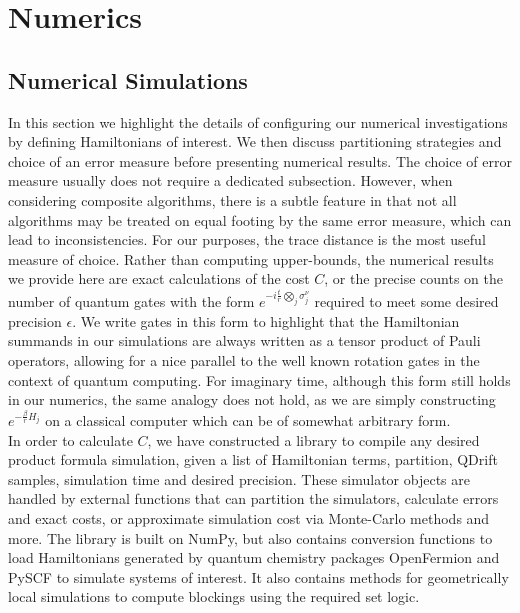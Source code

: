 \chapter{Numerics}


\section{Numerical Simulations} \label{sec:numerical_sim}
In this section we highlight the details of configuring our numerical investigations by defining Hamiltonians of interest. We then discuss partitioning strategies and choice of an error measure before presenting numerical results. The choice of error measure usually does not require a dedicated subsection. However, when considering composite algorithms, there is a subtle feature in that not all algorithms may be treated on equal footing by the same error measure, which can lead to inconsistencies. For our purposes, the trace distance is the most useful measure of choice. Rather than computing upper-bounds, the numerical results we provide here are exact calculations of the cost $C$, or the precise counts on the number of quantum gates with the form $e^{-i\frac{t}{r} \bigotimes_j \sigma_j^\nu}$ required to meet some desired precision $\epsilon$. We write gates in this form to highlight that the Hamiltonian summands in our simulations are always written as a tensor product of Pauli operators, allowing for a nice parallel to the well known rotation gates in the context of quantum computing. For imaginary time, although this form still holds in our numerics, the same analogy does not hold, as we are simply constructing $e^{-\frac{\beta}{r} H_j}$ on a classical computer which can be of somewhat arbitrary form. \\ %

In order to calculate $C$, we have constructed a library to compile any desired product formula simulation, given a list of Hamiltonian terms, partition, QDrift samples, simulation time and desired precision. These simulator objects are handled by external functions that can partition the simulators, calculate errors and exact costs, or approximate simulation cost via Monte-Carlo methods and more. The library is built on NumPy, but also contains conversion functions to load Hamiltonians generated by quantum chemistry packages OpenFermion \cite{mcclean2020openfermion} and PySCF \cite{sun2018pyscf} to simulate systems of interest. It also contains methods for geometrically local simulations to compute blockings using the required set logic.

